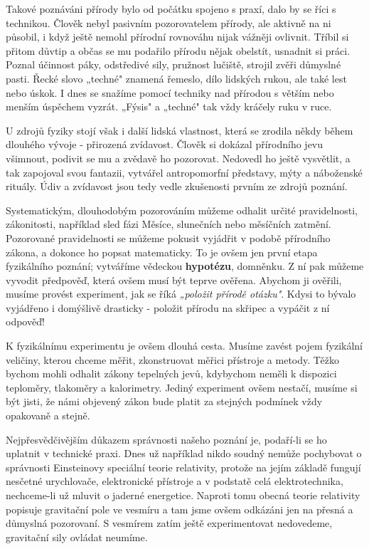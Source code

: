       Takové poznáváni přírody bylo od počátku spojeno s praxí, dalo by se říci s technikou. Člověk
      nebyl pasivním pozorovatelem přírody, ale aktivně na ni působil, i když ještě nemohl přírodní
      rovnováhu nijak vážněji ovlivnit. Tříbil si přitom důvtip a občas se mu podařilo přírodu nějak
      obelstít, usnadnit si práci. Poznal účinnost páky, odstředivé sily, pružnost lučiště, strojil
      zvěři důmyslné pasti. Řecké slovo „techné" znamená řemeslo, dílo lidských rukou, ale také lest
      nebo úskok. I dnes se snažíme pomocí techniky nad přírodou s větším nebo menším úspěchem
      vyzrát. „Fýsis" a „techné" tak vždy kráčely ruku v ruce. 

      U zdrojů fyziky stojí však i další lidská vlastnost, která se zrodila někdy během dlouhého
      vývoje - přirozená zvídavost. Člověk si dokázal přírodního jevu všimnout, podivit se mu a
      zvědavě ho pozorovat. Nedovedl ho ještě vysvětlit, a tak zapojoval svou fantazii, vytvářel
      antropomorfní představy, mýty a náboženské rituály. Údiv a zvídavost jsou tedy vedle
      zkušenosti prvním ze zdrojů poznání. 

      Systematickým, dlouhodobým pozorováním můžeme odhalit určité pravidelnosti, zákonitosti,
      například sled fázi Měsíce, slunečních nebo měsíčních zatmění. Pozorované pravidelnosti se
      můžeme pokusit vyjádřit v podobě přírodního zákona, a dokonce ho popsat matematicky. To je
      ovšem jen první etapa fyzikálního poznání; vytváříme vědeckou \textbf{hypotézu}, domněnku. Z
      ní pak můžeme vyvodit předpověď, která ovšem musí být teprve ověřena. Abychom ji ověřili,
      musíme provést experiment, jak se říká \emph{„položit přírodě otázku"}. Kdysi to bývalo
      vyjádřeno i domýšlivě drasticky - položit přírodu na skřipec a vypáčit z ní odpověď! 

      K fyzikálnímu experimentu je ovšem dlouhá cesta. Musíme zavést pojem fyzikální veličiny,
      kterou chceme měřit, zkonstruovat měřici přístroje a metody. Těžko bychom mohli odhalit zákony
      tepelných jevů, kdybychom neměli k dispozici teploměry, tlakoměry a kalorimetry. Jediný
      experiment ovšem nestačí, musíme si být jisti, že námi objevený zákon bude platit za stejných
      podmínek vždy opakovaně a stejně. 

      Nejpřesvědčivějším důkazem správnosti našeho poznání je, podaří-li se ho uplatnit v technické
      praxi. Dnes už například nikdo soudný nemůže pochybovat o správnosti Einsteinovy speciální
      teorie relativity, protože na jejím základě fungují nesčetné urychlovače, elektronické
      přístroje a v podstatě celá elektrotechnika, nechceme-li už mluvit o jaderné energetice.
      Naproti tomu obecná teorie relativity popisuje gravitační pole ve vesmíru a tam jsme ovšem
      odkázáni jen na přesná a důmyslná pozorovaní. S vesmírem zatím ještě experimentovat
      nedovedeme, gravitační sily ovládat neumíme.

